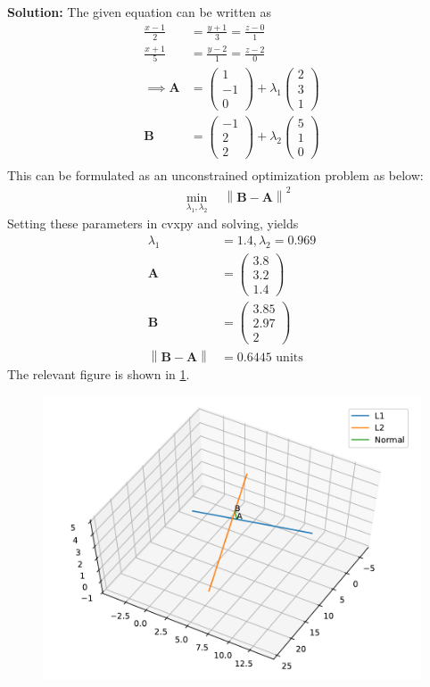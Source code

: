 \documentclass[12pt]{article}
\providecommand{\norm}[1]{\left\lVert#1\right\rVert}
\newcommand{\solution}{\noindent \textbf{Solution: }}
\newcommand{\myvec}[1]{\ensuremath{\begin{pmatrix}#1\end{pmatrix}}}
\let\vec\mathbf
\begin{document}
\begin{enumerate}
\solution 
The given equation can be written as
\begin{align}
	\label{eq:Eq1}
	\frac{x-1}{2} &= \frac{y+1}{3}=\frac{z-0}{1}\\ 
	\label{eq:Eq2}
	\frac{x+1}{5} &= \frac{y-2}{1}= \frac{z-2}{0} \\ 
	\implies 
	\vec{A} &= \myvec{1\\-1\\0} + \lambda_1\myvec{2\\3\\1}\\
        \vec{B} &= \myvec{-1\\2\\2} + \lambda_2\myvec{5\\1\\0} \\
\end{align}
This can be formulated as an unconstrained optimization problem as below:
\begin{align}
	&  \min_{\lambda_1, \lambda_2} \quad \norm{\vec{B}-\vec{A}}^2 
\end{align}
Setting these parameters in cvxpy and solving, yields
\begin{align}
        \lambda_1 &= 1.4 , \lambda_2 = 0.969 \\
	\vec{A} &= \myvec{3.8\\3.2\\ 1.4}\\
	\vec{B} &= \myvec{3.85\\2.97\\ 2}\\
	\norm{\vec{B}-\vec{A}} &= 0.6445 \text{ units}
\end{align}
The relevant figure is shown in \ref{fig:Fig1}. 
\begin{figure}[!h]
	\begin{center}
		\includegraphics[width=\columnwidth]{figs/problem30.pdf}
	\end{center}
\caption{}
\label{fig:Fig1}
\end{figure}
\end{enumerate}
\end{document}
